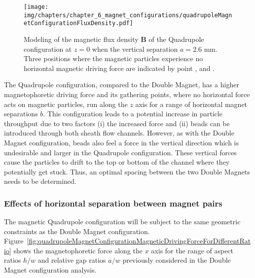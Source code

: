 \begin{figure}[htb]
   \centering
   \texttt{[image: img/chapters/chapter\_6\_magnet\_configurations/quadrupoleMagnetConfigurationFluxDensity.pdf]}
   \caption[Simulated vector field and flux density of the Quadrupole configuration]{Modeling of the magnetic flux density $\mathbf{B}$ of the Quadrupole configuration at $z=0$ when the vertical separation $a=2.6$ mm. Three positions where the magnetic particles experience no horizontal magnetic driving force are indicated by point ,  and .}
   \label{fig:magneticFluxDensityQuadrupoleMagnetConfiguration}
\end{figure}

The Quadrupole configuration, compared to the Double Magnet, has a higher magnetophoretic driving force and its gathering points, where no horizontal force acts on magnetic particles, run along the $z$ axis for a range of horizontal magnet separations $b$. This configuration leads to a potential increase in particle throughput due to two factors (i) the increased force and (ii) beads can be introduced through both sheath flow channels. However, as with the Double Magnet configuration, beads also feel a force in the vertical direction which is undesirable and larger in the Quadrupole configuration. These vertical forces cause the particles to drift to the top or bottom of the channel where they potentially get stuck. Thus, an optimal spacing between the two Double Magnets needs to be determined. 

\subsubsection{Effects of horizontal separation between magnet pairs}\label{subsubsec:effectsOfHorizontalSeparatinBetweenMagnetPairs}
The magnetic Quadrupole configuration will be subject to the same geometric constraints as the Double Magnet configuration. Figure~\ref{fig:quadrupoleMagnetConfigurationMagneticDrivingForceForDifferentRatio} shows the magnetophoretic force along the $x$ axis for the range of aspect ratios $h/w$ and relative gap ratios $a/w$ previously considered in the Double Magnet configuration analysis. 


